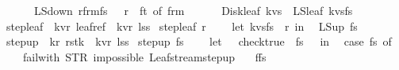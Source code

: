 \begin{isabellebody}
\ \ \ \ \ \ LS{\isacharunderscore}down\ {\isacharparenleft}r{\isacharprime}{\isacharcomma}frm{\isacharhash}fs{\isacharparenright}{\isacharparenright}\ \ {\isacharparenleft}{\isacharasterisk}\ r{\isacharprime}\ {\isacharequal}\ f{\isacharunderscore}t\ of\ frm\ {\isacharasterisk}{\isacharparenright}\isanewline
\ \ \ \ {\isacharbar}\ Disk{\isacharunderscore}leaf\ {\isacharparenleft}kvs{\isacharparenright}\ {\isasymRightarrow}\ LS{\isacharunderscore}leaf\ {\isacharparenleft}kvs{\isacharcomma}fs{\isacharparenright}{\isacharparenright}\isanewline
{\isacharparenright}{\isachardoublequoteclose}\isanewline
\isanewline
\isanewline
{}\isamarkupfalse%
\ step{\isacharunderscore}leaf\ {\isacharcolon}{\isacharcolon}\ {\isachardoublequoteopen}{\isacharparenleft}{\isacharprime}k{\isacharcomma}{\isacharprime}v{\isacharcomma}{\isacharprime}r{\isacharparenright}\ leaf{\isacharunderscore}ref\ {\isasymRightarrow}\ {\isacharparenleft}{\isacharprime}k{\isacharcomma}{\isacharprime}v{\isacharcomma}{\isacharprime}r{\isacharparenright}\ lss{\isachardoublequoteclose}\ \isanewline
{\isachardoublequoteopen}step{\isacharunderscore}leaf\ r\ {\isacharequal}\ {\isacharparenleft}\isanewline
\ \ let\ {\isacharparenleft}kvs{\isacharcomma}fs{\isacharparenright}\ {\isacharequal}\ r\ in\isanewline
\ \ LS{\isacharunderscore}up\ fs\isanewline
{\isacharparenright}{\isachardoublequoteclose}\isanewline
\isanewline
\isanewline
{}\isamarkupfalse%
\ step{\isacharunderscore}up\ {\isacharcolon}{\isacharcolon}\ {\isachardoublequoteopen}{\isacharparenleft}{\isacharprime}k{\isacharcomma}{\isacharprime}r{\isacharparenright}\ rstk\ {\isasymRightarrow}\ {\isacharparenleft}{\isacharprime}k{\isacharcomma}{\isacharprime}v{\isacharcomma}{\isacharprime}r{\isacharparenright}\ lss{\isachardoublequoteclose}\ \isanewline
{\isachardoublequoteopen}step{\isacharunderscore}up\ fs\ {\isacharequal}\ {\isacharparenleft}\isanewline
\ \ let\ {\isacharunderscore}\ {\isacharequal}\ check{\isacharunderscore}true\ {\isacharparenleft}{\isacharpercent}{\isacharunderscore}{\isachardot}\ fs\ {\isasymnoteq}\ {\isacharbrackleft}{\isacharbrackright}{\isacharparenright}\ in\isanewline
\ \ case\ fs\ of\ \isanewline
\ \ {\isacharbrackleft}{\isacharbrackright}\ {\isasymRightarrow}\ {\isacharparenleft}failwith\ {\isacharparenleft}STR\ {\isacharprime}{\isacharprime}impossible{\isacharcolon}\ Leaf{\isacharunderscore}stream{\isachardot}step{\isacharunderscore}up{\isacharprime}{\isacharprime}{\isacharparenright}{\isacharparenright}\isanewline
\ \ {\isacharbar}\ f{\isacharhash}fs{\isacharprime}\ {\isasymRightarrow}\ {\isacharparenleft}\isanewline

\end{isabellebody}
